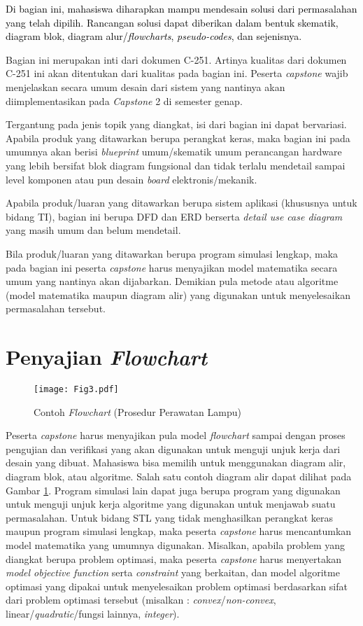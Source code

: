 \textcolor{black}{Di bagian ini, mahasiswa diharapkan mampu mendesain solusi dari permasalahan yang telah dipilih. Rancangan solusi dapat diberikan dalam bentuk skematik, diagram blok, diagram alur/\textit{flowcharts}, \textit{pseudo-codes}, dan sejenisnya.
}

Bagian ini merupakan inti dari dokumen C-251. Artinya kualitas dari dokumen C-251 ini akan ditentukan dari kualitas pada bagian ini. Peserta \textit{capstone} wajib menjelaskan secara umum desain dari sistem yang nantinya akan diimplementasikan pada \textit{Capstone} 2 di semester genap. 

Tergantung pada jenis topik yang diangkat, isi dari bagian ini dapat bervariasi. Apabila produk yang ditawarkan berupa perangkat keras, maka bagian ini pada umumnya akan berisi \textit{blueprint} umum/skematik umum perancangan hardware yang lebih bersifat blok diagram fungsional dan tidak terlalu mendetail sampai level komponen atau pun desain \textit{board} elektronis/mekanik. 

Apabila produk/luaran yang ditawarkan berupa sistem aplikasi (khususnya untuk bidang TI), bagian ini berupa DFD dan ERD berserta \textit{detail use case diagram} yang masih umum dan belum mendetail. 

Bila produk/luaran yang ditawarkan berupa program simulasi lengkap, maka pada bagian ini peserta \textit{capstone} harus menyajikan model matematika secara umum yang nantinya akan dijabarkan. Demikian pula metode atau algoritme (model matematika maupun diagram alir) yang digunakan untuk menyelesaikan permasalahan tersebut.

\section{Penyajian \textit{Flowchart}}
    
    \begin{figure}[!ht]
        \centering
        \texttt{[image: Fig3.pdf]}
        \caption{Contoh \textit{Flowchart} (Prosedur Perawatan Lampu)}
        \label{fig:Ch08_Flowchart}
    \end{figure}
    
    Peserta \textit{capstone} harus menyajikan pula model \textit{flowchart} sampai dengan proses pengujian dan verifikasi yang akan digunakan untuk menguji unjuk kerja dari desain yang dibuat. Mahasiswa bisa memilih untuk menggunakan diagram alir, diagram blok, atau algoritme. Salah satu contoh diagram alir dapat dilihat pada Gambar \ref{fig:Ch08_Flowchart}. Program simulasi lain dapat juga berupa program yang digunakan untuk menguji unjuk kerja algoritme yang digunakan untuk menjawab suatu permasalahan. Untuk bidang STL yang tidak menghasilkan perangkat keras maupun program simulasi lengkap, maka peserta \textit{capstone} harus mencantumkan model matematika yang umumnya digunakan. Misalkan, apabila problem yang diangkat berupa problem optimasi, maka peserta \textit{capstone} harus menyertakan \textit{model objective function} serta \textit{constraint} yang berkaitan, dan model algoritme optimasi yang dipakai untuk menyelesaikan problem optimasi berdasarkan sifat dari problem optimasi tersebut (misalkan : \textit{convex}/\textit{non-convex}, linear/\textit{quadratic}/fungsi lainnya, \textit{integer}).
